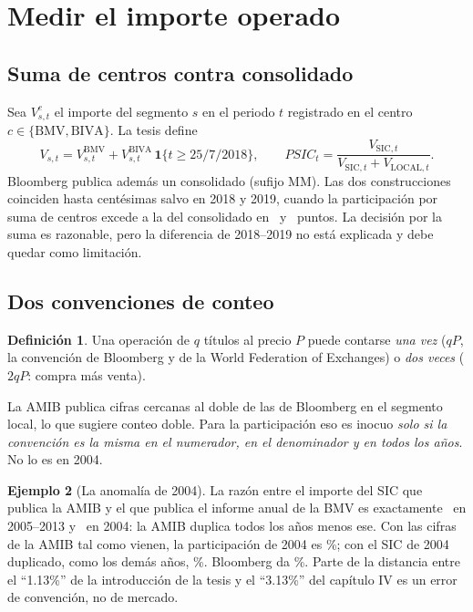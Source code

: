 \documentclass[11pt,letterpaper]{article}
\theoremstyle{definition}
\newtheorem{definicion}{Definición}[section]
\newtheorem{ejemplo}[definicion]{Ejemplo}
\theoremstyle{plain}
\newcommand{\PSIC}{\mathit{PSIC}}
\begin{document}
\section{Medir el importe operado}

\subsection{Suma de centros contra consolidado}
Sea $V^{c}_{s,t}$ el importe del segmento $s$ en el periodo $t$ registrado en el centro $c\in\{\mathrm{BMV},\mathrm{BIVA}\}$. La tesis define
\[
V_{s,t}=V^{\mathrm{BMV}}_{s,t}+V^{\mathrm{BIVA}}_{s,t}\,\mathbf 1\{t\ge 25/7/2018\},\qquad
\PSIC_t=\frac{V_{\mathrm{SIC},t}}{V_{\mathrm{SIC},t}+V_{\mathrm{LOCAL},t}}.
\]
Bloomberg publica además un consolidado (sufijo MM). Las dos construcciones coinciden hasta centésimas salvo en 2018 y 2019, cuando la participación por suma de centros excede a la del consolidado en \RdifDosMilDieciocho\ y \RdifDosMilDiecinueve\ puntos. La decisión por la suma es razonable, pero la diferencia de 2018--2019 no está explicada y debe quedar como limitación.

\subsection{Dos convenciones de conteo}
\begin{definicion}
Una operación de $q$ títulos al precio $P$ puede contarse \emph{una vez} ($qP$, la convención de Bloomberg y de la World Federation of Exchanges) o \emph{dos veces} ($2qP$: compra más venta).
\end{definicion}
La AMIB publica cifras cercanas al doble de las de Bloomberg en el segmento local, lo que sugiere conteo doble. Para la participación eso es inocuo \emph{solo si la convención es la misma en el numerador, en el denominador y en todos los años}. No lo es en 2004.

\begin{ejemplo}[La anomalía de 2004]
La razón entre el importe del SIC que publica la AMIB y el que publica el informe anual de la BMV es exactamente \RrazonAmibMin\ en 2005--2013 y \RrazonAmibCuatro\ en 2004: la AMIB duplica todos los años menos ese. Con las cifras de la AMIB tal como vienen, la participación de 2004 es \RamibDosMilCuatro\%; con el SIC de 2004 duplicado, como los demás años, \RamibCorregido\%. Bloomberg da \RbbgDosMilCuatro\%. Parte de la distancia entre el ``1.13\%'' de la introducción de la tesis y el ``3.13\%'' del capítulo IV es un error de convención, no de mercado.
\end{ejemplo}
\end{document}
